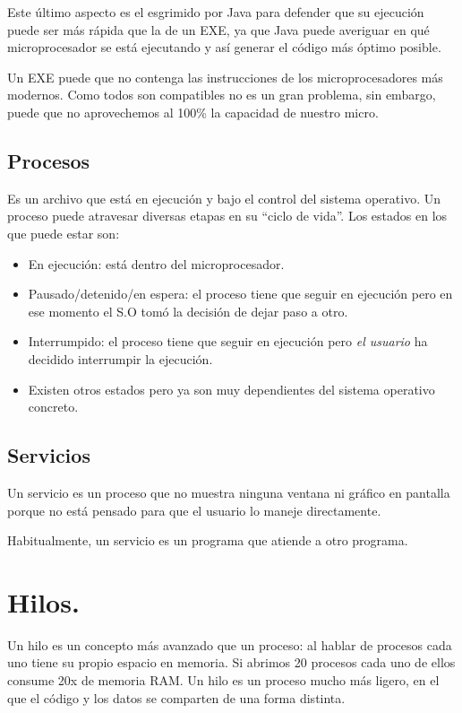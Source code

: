 \documentclass[a4paper,12pt,spanish]{sphinxmanual}
\begin{document}
Este último aspecto es el esgrimido por Java para defender que su ejecución puede ser más rápida que la de un EXE, ya que Java puede averiguar en qué microprocesador se está ejecutando y así generar el código más óptimo posible.

Un EXE puede que no contenga las instrucciones de los microprocesadores más modernos. Como todos son compatibles no es un gran problema, sin embargo, puede que no aprovechemos al 100\% la capacidad de nuestro micro.


\subsection{Procesos}
\label{textos/tema1:procesos}
Es un archivo que está en ejecución y bajo el control del sistema operativo. Un proceso puede atravesar diversas etapas en su ``ciclo de vida''. Los estados en los que puede estar son:
\begin{itemize}
\item {} 
En ejecución: está dentro del microprocesador.

\item {} 
Pausado/detenido/en espera: el proceso tiene que seguir en ejecución pero en ese momento el S.O tomó la decisión de dejar paso a otro.

\item {} 
Interrumpido: el proceso tiene que seguir en ejecución pero \emph{el usuario} ha decidido interrumpir la ejecución.

\item {} 
Existen otros estados pero ya son muy dependientes del sistema operativo concreto.

\end{itemize}


\subsection{Servicios}
\label{textos/tema1:servicios}
Un servicio es un proceso que no muestra ninguna ventana ni gráfico en pantalla porque no está pensado para que el usuario lo maneje directamente.

Habitualmente, un servicio es un programa que atiende a otro programa.


\section{Hilos.}
\label{textos/tema1:hilos}
Un hilo es un concepto más avanzado que un proceso: al hablar de procesos cada uno tiene su propio espacio en memoria. Si abrimos 20 procesos cada uno de ellos consume 20x de memoria RAM. Un hilo es un proceso mucho más ligero, en el que el código y los datos se comparten de una forma distinta.
\end{document}
